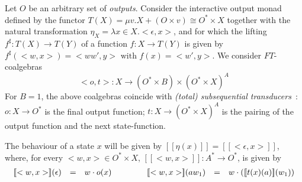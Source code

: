 \documentclass{LMCS}
\newcommand{\bb}[1]{[\![ #1 ]\!]}
\begin{document}
Let $O$ be an arbitrary set of \emph{outputs}. Consider the interactive output monad defined by
the functor $T(X) =  \mu v. X + (O\times v) \cong O^*\times X$ together with the natural transformation
$\eta_X = \lambda x \in X. <\epsilon, x>$, and for which the lifting
$f^\sharp \colon T(X) \to T(Y)$ of a function $f\colon X\to T(Y)$ is given by
$f^\sharp (<w,x>) = <ww',y>  \text{ with } f(x) = <w',y> $.
We consider  $FT$-coalgebras
\[
<o,t>\colon X
\to
(O^*\times B) \times (O^*\times X)^A
\]
For $B=1$, the above coalgebras coincide with \emph{(total) subsequential transducers}~\cite{helle}: 
$o\colon X\to O^*$ is the final output function; $t \colon X \to (O^* \times X)^A$ is the
pairing of the output function and the next state-function.

The behaviour of a state $x$ will be given by 
$\bb{\eta(x)} = \bb{<\epsilon, x>}$, where, for every 
$<w,x>\in O^*\times X$, $\bb{<w,x>}\colon A^* \to O^*$, is given by
\[
\begin{array}{lcl@{\hspace{1.5cm}}lcl}
\bb{<w,x>} (\epsilon) &=& w\cdot o(x) &
\bb{<w,x>} (aw_1) &=& w \cdot (\bb{t(x)(a)}(w_1))
\end{array}
\]
\end{document}
